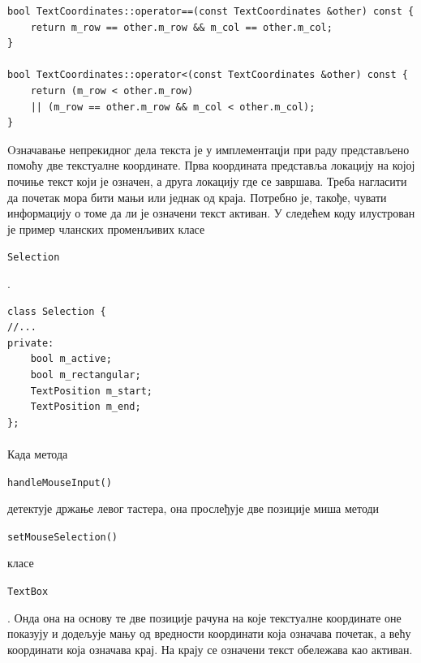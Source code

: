 \documentclass[12pt,oneside]{memoir}
\begin{document}
\begin{verbatim}
bool TextCoordinates::operator==(const TextCoordinates &other) const {
	return m_row == other.m_row && m_col == other.m_col;
}

bool TextCoordinates::operator<(const TextCoordinates &other) const {
	return (m_row < other.m_row) 
	|| (m_row == other.m_row && m_col < other.m_col);
}
\end{verbatim}

Oзначавање непрекидног дела текста је у имплементацји при раду представљено помоћу две текстуалне координате. Прва координата представља локацију на којој почиње текст који је
означен, а друга локацију где се завршава. Треба нагласити да почетак мора бити мањи или једнак од краја. Потребно је, такође, чувати информацију о томе да ли је означени текст активан. У следећем коду илустрован је пример чланских променљивих класе 
\begin{latinica}\verb|Selection|\end{latinica}.

\begin{verbatim}
class Selection {
//...
private:
	bool m_active;
	bool m_rectangular;
	TextPosition m_start;
	TextPosition m_end;
};
\end{verbatim}


\paragraph{}
Када метода \begin{latinica}\verb|handleMouseInput()|\end{latinica} детектује држање
левог тастера, она прослеђује две позиције миша методи \begin{latinica}\verb|setMouseSelection()|\end{latinica} класе
\begin{latinica}\verb|TextBox|\end{latinica}. Онда она на основу те две позиције
рачуна на које текстуалне координате оне показују и додељује мању од вредности координати
која означава почетак, а већу координати која означава крај. 
На крају се означени текст обележава као активан.
\end{document}
